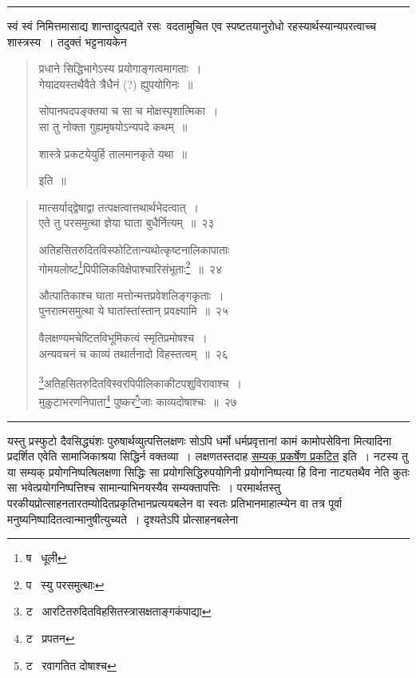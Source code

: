 \documentclass[11pt, openany]{book}
\begin{document}
\hrule

\vspace{2mm}
{\qt स्वं स्वं निमित्तमासाद्य शान्तादुत्पद्यते रसः}\textendash\ वदतामुचित एव स्पष्टतयानुरोधो रहस्यार्थस्यान्यपरत्वाच्च शास्त्रस्य~। तदुक्तं भट्टनायकेन\textendash

\begin{quote}
{\qt प्रधाने सिद्धिभागेऽस्य प्रयोगाङ्गत्वमागताः~।\\
गेयादयस्तथैवैते त्रैधैनं (?) ह्युपयोगिनः~॥

सोपानपदपङ्क्तया च सा च मोक्षस्पृशात्मिका~।\\
सा तु नोक्ता गुह्यमृषयोऽन्यपदे कथम्~॥

शास्त्रे प्रकटयेयुर्हि तालमानकृते यथा~॥} इति~॥
\end{quote}


\newpage
\lfoot{}

\begin{quote}
{\na मात्सर्याद्द्वेषाद्वा तत्पक्षत्वात्तथार्थभेदत्वात्~।\\
एते तु परसमुत्था ज्ञेया घाता बुधैर्नित्यम्~॥~२३

अतिहसितरुदितविस्फोटितान्यथोत्कृष्टनालिकापाताः \\
गोमयलोष्ट\renewcommand{\thefootnote}{1}\footnote{ष \textendash\  धूली}पिपीलिकविक्षेपाश्चारिसंभूताः\renewcommand{\thefootnote}{2}\footnote{प \textendash\  स्यु परसमुत्थाः}~॥~२४

औत्पातिकाश्च घाता मत्तोन्मत्तप्रवेशलिङ्गकृताः~।\\
पुनरात्मसमुत्था ये घातांस्तांस्तान् प्रवक्ष्यामि~॥~२५

वैलक्षण्यमचेष्टितविभूमिकत्वं स्मृतिप्रमोषश्च~।\\
अन्यवचनं च काव्यं तथार्तनादो विहस्तत्वम्~॥~२६

\renewcommand{\thefootnote}{3}\footnote{ट \textendash\  आरटितरुदितविहसितस्त्रासक्षताङ्गकंपाद्या}अतिहसितरुदितविस्वरपिपीलिकाकीटपशुविरावाश्च~।\\
मुकुटाभरणनिपाता\renewcommand{\thefootnote}{4}\footnote{ट \textendash\  प्रपतन} पुष्कर\renewcommand{\thefootnote}{5}\footnote{ट \textendash\  रवागतित दोषाश्च}जाः काव्यदोषाश्चः~॥~२७}
\end{quote}

\hrule

\vspace{2mm}
यस्तु प्रस्फुटो दैवसिद्ध्यंशः पुरुषार्थव्युत्पत्तिलक्षणः सोऽपि {\qt धर्मो धर्मप्रवृत्तानां कामं कामोपसेविना} मित्यादिना प्रदर्शित एवेति सामाजिकाश्रया सिद्धिर्न वक्तव्या~। लक्षणतस्तदाह \underline{सम्यक् प्रकर्षेण प्रकटित} इति~। नटस्य तु या सम्यक् प्रयोगनिष्पत्षिलक्षणा सिद्धिः सा प्रयोगसिद्धिरुपयोगिनी प्रयोगनिष्पत्या हि विना नाट्यतथैव नेति कुतः सा भवेत्प्रयोगनिष्पत्तिश्च सामान्याभिनयस्यैव सम्यक्तापत्तिः~। परमार्थतस्तु परकीयप्रोत्साहनतारतम्योदितप्रकृतिभानप्रत्ययबलेन वा स्वतः प्रतिभानमाहात्म्येन वा तत्र पूर्वा मनुष्यनिष्पादितत्वान्मानुषीत्युच्यते~। दृश्यतेऽपि प्रोत्साहनबलेना\textendash
\end{document}
